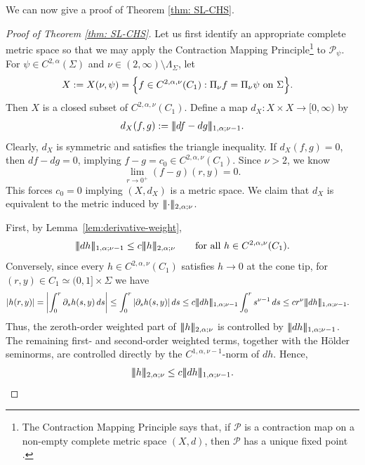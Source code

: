 \documentclass[11pt]{amsart}
\DeclarePairedDelimiter{\tnorm}{\vert\!\vert\!\vert}{\vert\!\vert\!\vert}
\theoremstyle{definition}
\theoremstyle{remark}
\begin{document}
We can now give a proof of Theorem \ref{thm: SL-CHS}. 
\begin{proof}[Proof of Theorem \ref{thm: SL-CHS}]
    Let us first identify an appropriate complete metric space so that we may apply the Contraction Mapping Principle\footnote{The Contraction Mapping Principle says that, if $\mathcal{P}$ is a contraction map on a non-empty complete metric space $(X, d)$, then $\mathcal{P}$ has a unique fixed point \cite[Theorem 9.23]{Ru76}.} to $\mathcal{P}_\psi$. For $\psi\in C^{2,\alpha}(\Sigma)$ and $\nu \in (2,\infty) \setminus \Lambda_\Sigma$, let
\begin{align*}
X := X(\nu,\psi) = \Bigl\{& f \in C^{2,\alpha, \nu}(C_{1}): \Pi_\nu f=\Pi_\nu \psi\text{ on }\Sigma \Bigr\}.
\end{align*}
Then $X$ is a closed subset of $C^{2,\alpha,\nu}(C_1)$. Define a map $d_X: X \times X \rightarrow [0,\infty)$ by
\begin{align*}
    d_X(f,g) := \tnorm{df - dg}_{1,\alpha;\nu-1}.
\end{align*}
Clearly, $d_X$ is symmetric and satisfies the triangle inequality. If $d_X(f,g) = 0$, then $df- dg = 0$, implying $f - g = c_0 \in C^{2,\alpha,\nu}(C_1)$. Since $\nu > 2$, we know 
\[\lim_{r \rightarrow 0^+} (f-g)(r,y) = 0.\]
This forces $c_0 = 0$ implying $(X,d_X)$ is a metric space. We claim that $d_X$ is equivalent to the metric induced by
$\tnorm{\cdot}_{2,\alpha;\nu}$. 

First, by
Lemma~\ref{lem:derivative-weight},
\begin{align}\label{eq: equivalence-norms-1}
\tnorm{dh}_{1,\alpha;\nu-1}
\leq
c\tnorm{h}_{2,\alpha;\nu}
\qquad
\text{for all } h\in C^{2,\alpha,\nu}(C_1).
\end{align}
Conversely, since every $h\in C^{2,\alpha,\nu}(C_1)$ satisfies
$h\to0$ at the cone tip, for $(r,y)\in C_1\simeq (0,1]\times\Sigma$
we have
\begin{align*}
|h(r,y)|
&=
\left|\int_0^r \partial_s h(s,y)\,ds\right|  \leq
\int_0^r |\partial_s h(s,y)|\,ds \leq
c\tnorm{dh}_{1,\alpha;\nu-1}\int_0^r s^{\nu-1}\,ds  \leq
c r^\nu \tnorm{dh}_{1,\alpha;\nu-1}.
\end{align*}
Thus, the zeroth-order weighted part of $\tnorm{h}_{2,\alpha;\nu}$ is
controlled by $\tnorm{dh}_{1,\alpha;\nu-1}$. The remaining first- and
second-order weighted terms, together with the Hölder seminorms, are
controlled directly by the $C^{1,\alpha,\nu-1}$-norm of $dh$. Hence,
\begin{align}\label{eq: equivalence-norms-2}
\tnorm{h}_{2,\alpha;\nu}
\leq
c\tnorm{dh}_{1,\alpha;\nu-1}.
\end{align}


\end{proof}
\end{document}
